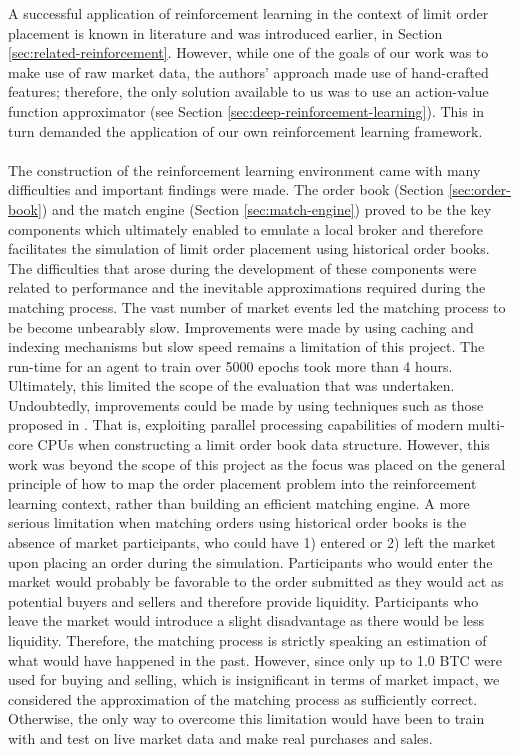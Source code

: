     A successful application of reinforcement learning in the context of limit order placement is known in literature\cite{nevmyvaka2006reinforcement} and was introduced earlier, in Section \ref{sec:related-reinforcement}.
    However, while one of the goals of our work was to make use of raw market data, the authors' approach made use of hand-crafted features;  therefore, the only solution available to us was to use an action-value function approximator (see Section \ref{sec:deep-reinforcement-learning}).
    This in turn demanded the application of our own reinforcement learning framework.
    \\
    \\
    The construction of the reinforcement learning environment came with many difficulties and important findings were made.
    The order book (Section \ref{sec:order-book}) and the match engine (Section \ref{sec:match-engine}) proved to be the key components which ultimately enabled to emulate a local broker and therefore facilitates the simulation of limit order placement using historical order books.
    The difficulties that arose during the development of these components were related to performance and the inevitable approximations required during the matching process.
    The vast number of market events led the matching process to be become unbearably slow.
    Improvements were made by using caching and indexing mechanisms but slow speed remains a limitation of this project. The run-time for an agent to train over 5000 epochs took more than 4 hours.
    Ultimately, this limited the scope of the evaluation that was undertaken. 
    Undoubtedly, improvements could be made by using techniques such as those proposed in \cite{barazzutti2016exploiting}.
    That is, exploiting parallel processing capabilities of modern multi-core CPUs when constructing a limit order book data structure.
    However, this work was beyond the scope of this project as the focus was placed on the general principle of how to map the order placement problem into the reinforcement learning context, rather than building an efficient matching engine.
    A more serious limitation when matching orders using historical order books is the absence of market participants, who could have 1) entered or 2) left the market upon placing an order during the simulation.
    Participants who would enter the market would probably be favorable to the order submitted as they would act as potential buyers and sellers and therefore provide liquidity.
    Participants who leave the market would introduce a slight disadvantage as there would be less liquidity.
    Therefore, the matching process is strictly speaking an estimation of what would have happened in the past.
    However, since only up to 1.0 BTC were used for buying and selling, which is insignificant in terms of market impact\cite{hautsch2012market}, we considered the approximation of the matching process as sufficiently correct.
    Otherwise, the only way to overcome this limitation would have been to train with and test on live market data and make real purchases and sales.
    

